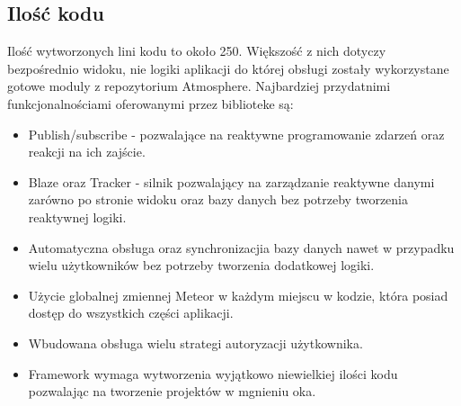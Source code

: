 \documentclass[12pt]{report}
\begin{document}
    \subsection{Ilość kodu}
      Ilość wytworzonych lini kodu to około 250.
      Większość z nich dotyczy bezpośrednio widoku, nie logiki aplikacji do której obsługi zostały wykorzystane gotowe moduly z repozytorium Atmosphere.
      Najbardziej przydatnimi funkcjonalnościami oferowanymi przez biblioteke są:
      \begin{itemize}
        \item Publish/subscribe - pozwalające na reaktywne programowanie zdarzeń oraz reakcji na ich zajście.
        \item Blaze oraz Tracker - silnik pozwalający na zarządzanie reaktywne danymi zarówno po stronie widoku oraz bazy danych bez potrzeby tworzenia reaktywnej logiki.
        \item Automatyczna obsługa oraz synchronizacjia bazy danych nawet w przypadku wielu użytkowników bez potrzeby tworzenia dodatkowej logiki.
        \item Użycie globalnej zmiennej Meteor w każdym miejscu w kodzie, która posiad dostęp do wszystkich części aplikacji.
        \item Wbudowana obsługa wielu strategi autoryzacji użytkownika.
        \item Framework wymaga wytworzenia wyjątkowo niewielkiej ilości kodu pozwalając na tworzenie projektów w mgnieniu oka.
      \end{itemize}
\end{document}
